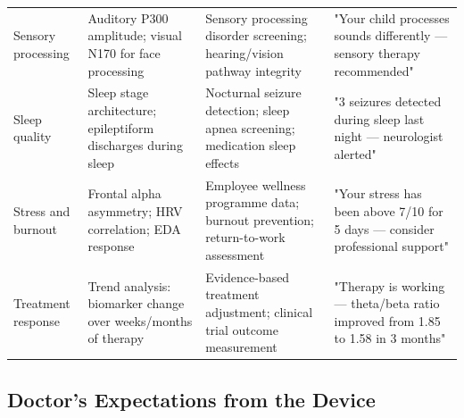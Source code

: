 {\begin{xltabular}{\textwidth}{@{} p{2.2cm} L L L @{}}
\addlinespace
Sensory processing & Auditory P300 amplitude; visual N170 for face processing & Sensory processing disorder screening; hearing/vision pathway integrity & "Your child processes sounds differently --- sensory therapy recommended" \\
\addlinespace
Sleep quality & Sleep stage architecture; epileptiform discharges during sleep & Nocturnal seizure detection; sleep apnea screening; medication sleep effects & "3 seizures detected during sleep last night --- neurologist alerted" \\
\addlinespace
Stress and burnout & Frontal alpha asymmetry; HRV correlation; EDA response & Employee wellness programme data; burnout prevention; return-to-work assessment & "Your stress has been above 7/10 for 5 days --- consider professional support" \\
\addlinespace
Treatment response & Trend analysis: biomarker change over weeks/months of therapy & Evidence-based treatment adjustment; clinical trial outcome measurement & "Therapy is working --- theta/beta ratio improved from 1.85 to 1.58 in 3 months" \\
\end{xltabular}}

\subsection{Doctor's Expectations from the Device}

